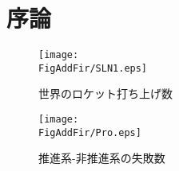 \chapter{序論}
\newcommand{\FigAddFir}{./src/Chapter1/graph/eps}




\begin{figure}
\centering
\texttt{[image: \\FigAddFir/SLN1.eps]}
\caption{世界のロケット打ち上げ数}
\label{fig:Success/Failure}
\end{figure}
\begin{figure}
\centering
\texttt{[image: \\FigAddFir/Pro.eps]}
\caption{推進系-非推進系の失敗数}
\label{fig:ProFail}
\end{figure}
